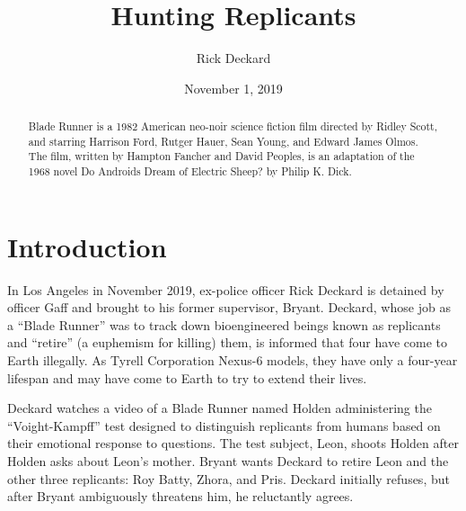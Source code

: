\documentclass{article}
\title{Hunting Replicants}
\author{Rick Deckard}
\date{November 1, 2019}
\begin{document}
\maketitle

\begin{abstract}
  Blade Runner is a 1982 American neo-noir science fiction film
  directed by Ridley Scott, and starring Harrison Ford, Rutger Hauer,
  Sean Young, and Edward James Olmos. The film, written by Hampton
  Fancher and David Peoples, is an adaptation of the 1968 novel Do
  Androids Dream of Electric Sheep? by Philip K. Dick.
\end{abstract}

\section*{Introduction}

In Los Angeles in November 2019, ex-police officer Rick Deckard is
detained by officer Gaff and brought to his former supervisor,
Bryant. Deckard, whose job as a ``Blade Runner'' was to track down
bioengineered beings known as replicants and ``retire'' (a euphemism
for killing) them, is informed that four have come to Earth
illegally. As Tyrell Corporation Nexus-6 models, they have only a
four-year lifespan and may have come to Earth to try to extend their
lives.

Deckard watches a video of a Blade Runner named Holden administering
the ``Voight-Kampff'' test designed to distinguish replicants from
humans based on their emotional response to questions. The test
subject, Leon, shoots Holden after Holden asks about Leon's
mother. Bryant wants Deckard to retire Leon and the other three
replicants: Roy Batty, Zhora, and Pris. Deckard initially refuses, but
after Bryant ambiguously threatens him, he reluctantly agrees.
\end{document}

